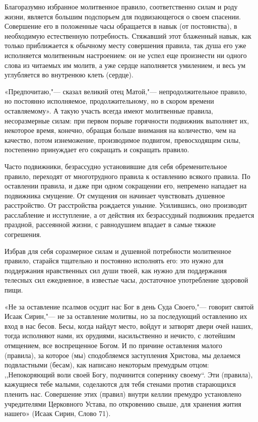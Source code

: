 Благоразумно избранное молитвенное правило, соответственно силам и роду жизни, является большим подспорьем для подвизающегося о своем спасении. Совершение его в положенные часы обращается в навык (от постоянства), в необходимую естественную потребность. Стяжавший этот блаженный навык, как только приближается к обычному месту совершения правила, так душа его уже исполняется молитвенным настроением: он не успел еще произнести ни одного слова из читаемых им молитв, а уже сердце наполняется умилением, и весь ум углубляется во внутренюю клеть (сердце).

«Предпочитаю,"--- сказал великий отец Матой,"--- непродолжительное правило, но постоянно исполняемое, продолжительному, но в скором времени оставляемому». А такую участь всегда имеют молитвенные правила, несоразмерные силам: при первом порыве горячности подвижник выполняет их, некоторое время, конечно, обращая больше внимания на количество, чем на качество, потом изнеможение, производимое подвигом, превосходящим силы, постепенно принуждает его сокращать и сокращать правило.

Часто подвижники, безрассудно установившие для себя обременительное правило, переходят от многотрудного правила к оставлению всякого правила. По оставлении правила, и даже при одном сокращении его, непремено нападает на подвижника смущение. От смущения он начинает чувствовать душевное расстройство. От расстройства рождается уныние. Усилившись, оно производит расслабление и исступление, а от действия их безрассудный подвижник предается праздной, рассеянной жизни, с равнодушием впадает в самые тяжкие согрешения.

Избрав для себя соразмерное силам и душевной потребности молитвенное правило, старайся тщательно и постоянно исполнять его: это нужно для поддержания нравственных сил души твоей, как нужно для поддержания телесных сил ежедневное, в известые часы, достаточное употребление здоровой пищи.

«Не за оставление псалмов осудит нас Бог в день Суда Своего,"--- говорит святой Исаак Сирин,"--- не за оставление молитвы, но за последующий оставлению их вход в нас бесов. Бесы, когда найдут место, войдут и затворят двери очей наших, тогда исполняют нами, их орудиями, насильственно и нечисто, с лютейшим отмщением, все воспрещенное Богом. И по причине оставления малого (правила), за которое (мы) сподобляемся заступления Христова, мы делаемся подвластными (бесам), как написано некоторым премудрым отцом: ,,Непокоряющий воли своей Богу, подчинится сопернику своему``. Эти (правила), кажущиеся тебе малыми, соделаются для тебя стенами против старающихся пленить нас. Совершение этих (правил) внутри келлии премудро установлено учредителями Церковного Устава, по откровению свыше, для хранения жития нашего» (Исаак Сирин, Слово 71).

